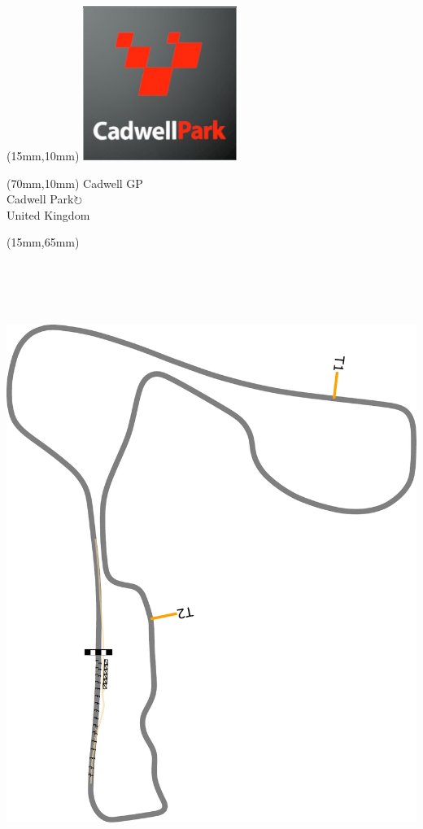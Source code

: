 \null\newpage
\begin{textblock*}{50mm}(15mm,10mm)%
\includegraphics[width=50mm]{LG/2015-05-20_00076.png}
\end{textblock*}
\begin{textblock*}{130mm}(70mm,10mm)%
{\fontsize{20}{20}\selectfont Cadwell GP\\}
{\fontsize{16}{16}\selectfont Cadwell Park\hfill \Large$\circlearrowright$\\}
{\fontsize{12}{12}\selectfont United Kingdom\\}
\end{textblock*}
\begin{textblock*}{185mm}(15mm,65mm)%
\centering
\mbox{\includegraphics[width=185mm,height=210mm,keepaspectratio]{PT/CADGP.pdf}}
\end{textblock*}
